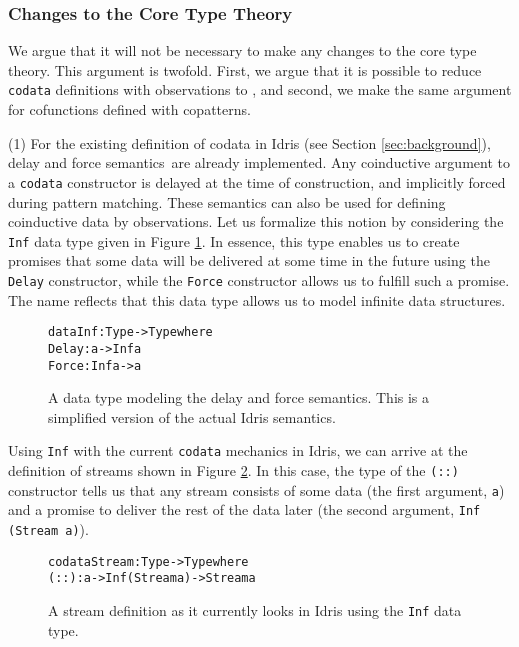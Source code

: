 \subsubsection{Changes to the Core Type Theory}
We argue that it will not be necessary to make any changes to the core type theory. This argument is twofold. First, we argue that it is possible to reduce \texttt{codata} definitions with observations to \TT, and second, we make the same argument for cofunctions defined with copatterns.

(1) For the existing definition of codata in Idris (see Section \ref{sec:background}), delay and force semantics\,\citep[Section 3.5]{Abelson96SICP} are already implemented. Any coinductive argument to a \texttt{codata} constructor is delayed at the time of construction, and implicitly forced during pattern matching. These semantics can also be used for defining coinductive data by observations. Let us formalize this notion by considering the \texttt{Inf} data type given in Figure \ref{fig:Inf_datatype}. In essence, this type enables us to create promises that some data will be delivered at some time in the future using the \texttt{Delay} constructor, while the \texttt{Force} constructor allows us to fulfill such a promise. The name reflects that this data type allows us to model infinite data structures.

\begin{figure}
\begin{alltt}
data Inf : Type -> Type where
  Delay : a -> Inf a
  Force : Inf a -> a
\end{alltt}
\caption{A data type modeling the delay and force semantics. This is a simplified version of the actual Idris semantics.}
\label{fig:Inf_datatype}
\end{figure}

Using \texttt{Inf} with the current \texttt{codata} mechanics in Idris, we can arrive at the definition of streams shown in Figure \ref{fig:stream_current_Inf}. In this case, the type of the \texttt{(::)} constructor tells us that any stream consists of some data (the first argument, \texttt{a}) and a promise to deliver the rest of the data later (the second argument, \texttt{Inf (Stream a)}).

\begin{figure}
\begin{alltt}
codata Stream : Type -> Type where
  (::) : a -> Inf (Stream a) -> Stream a
\end{alltt}
\caption{A stream definition as it currently looks in Idris using the \texttt{Inf} data type.}
\label{fig:stream_current_Inf}
\end{figure}

